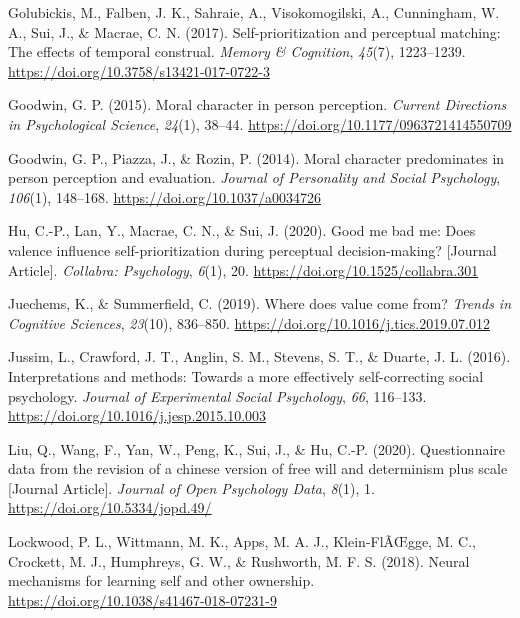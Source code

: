 \documentclass[
  man]{apa6}
\newlength{\cslhangindent}
\newlength{\cslentryspacingunit} %
\newenvironment{CSLReferences}[2] %
 {%
  \setlength{\parindent}{0pt}
  \ifodd #1
  \let\oldpar\par
  \def\par{\hangindent=\cslhangindent\oldpar}
  \fi
  \setlength{\parskip}{#2\cslentryspacingunit}
 }%
 {}
\begin{document}
\begin{CSLReferences}{1}{0}
\leavevmode{}%
Golubickis, M., Falben, J. K., Sahraie, A., Visokomogilski, A., Cunningham, W. A., Sui, J., \& Macrae, C. N. (2017). Self-prioritization and perceptual matching: The effects of temporal construal. \emph{Memory \& Cognition}, \emph{45}(7), 1223--1239. \url{https://doi.org/10.3758/s13421-017-0722-3}

\leavevmode{}%
Goodwin, G. P. (2015). Moral character in person perception. \emph{Current Directions in Psychological Science}, \emph{24}(1), 38--44. \url{https://doi.org/10.1177/0963721414550709}

\leavevmode{}%
Goodwin, G. P., Piazza, J., \& Rozin, P. (2014). Moral character predominates in person perception and evaluation. \emph{Journal of Personality and Social Psychology}, \emph{106}(1), 148--168. \url{https://doi.org/10.1037/a0034726}

\leavevmode{}%
Hu, C.-P., Lan, Y., Macrae, C. N., \& Sui, J. (2020). Good me bad me: Does valence influence self-prioritization during perceptual decision-making? {[}Journal Article{]}. \emph{Collabra: Psychology}, \emph{6}(1), 20. \url{https://doi.org/10.1525/collabra.301}

\leavevmode{}%
Juechems, K., \& Summerfield, C. (2019). Where does value come from? \emph{Trends in Cognitive Sciences}, \emph{23}(10), 836--850. \url{https://doi.org/10.1016/j.tics.2019.07.012}

\leavevmode{}%
Jussim, L., Crawford, J. T., Anglin, S. M., Stevens, S. T., \& Duarte, J. L. (2016). Interpretations and methods: {Towards} a more effectively self-correcting social psychology. \emph{Journal of Experimental Social Psychology}, \emph{66}, 116--133. \url{https://doi.org/10.1016/j.jesp.2015.10.003}

\leavevmode{}%
Liu, Q., Wang, F., Yan, W., Peng, K., Sui, J., \& Hu, C.-P. (2020). Questionnaire data from the revision of a chinese version of free will and determinism plus scale {[}Journal Article{]}. \emph{Journal of Open Psychology Data}, \emph{8}(1), 1. \url{https://doi.org/10.5334/jopd.49/}

\leavevmode{}%
Lockwood, P. L., Wittmann, M. K., Apps, M. A. J., Klein-FlÃŒgge, M. C., Crockett, M. J., Humphreys, G. W., \& Rushworth, M. F. S. (2018). Neural mechanisms for learning self and other ownership. \url{https://doi.org/10.1038/s41467-018-07231-9}


\end{CSLReferences}
\end{document}
